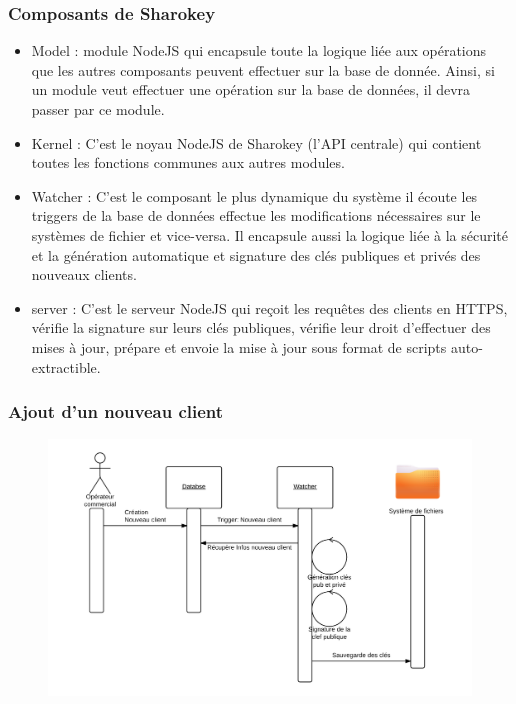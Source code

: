 \documentclass{beamer}
\begin{document}
\begin{frame}
\frametitle{Composants de Sharokey}
\begin{itemize}
\item Model : module NodeJS qui encapsule toute la logique liée aux opérations que les autres
composants peuvent effectuer sur la base de donnée. Ainsi, si un module veut effectuer
une opération sur la base de données, il devra passer par ce module.
\item Kernel : C’est le noyau NodeJS de Sharokey (l’API centrale) qui contient toutes les
fonctions communes aux autres modules.
\item Watcher : C’est le composant le plus dynamique du système il écoute les triggers de la base
de données effectue les modifications nécessaires sur le systèmes de fichier et vice-versa.
Il encapsule aussi la logique liée à la sécurité et la génération automatique et signature
des clés publiques et privés des nouveaux clients.
\item server : C’est le serveur NodeJS qui reçoit les requêtes des clients en HTTPS, vérifie la
signature sur leurs clés publiques, vérifie leur droit d’effectuer des mises à jour, prépare
et envoie la mise à jour sous format de scripts auto-extractible.

\end{itemize}
\end{frame}

\begin{frame}
\frametitle{Ajout d'un nouveau client}
\begin{figure}
\centering
\includegraphics[scale=0.4]{images/1.png}
\end{figure}
\end{frame}
\end{document}
